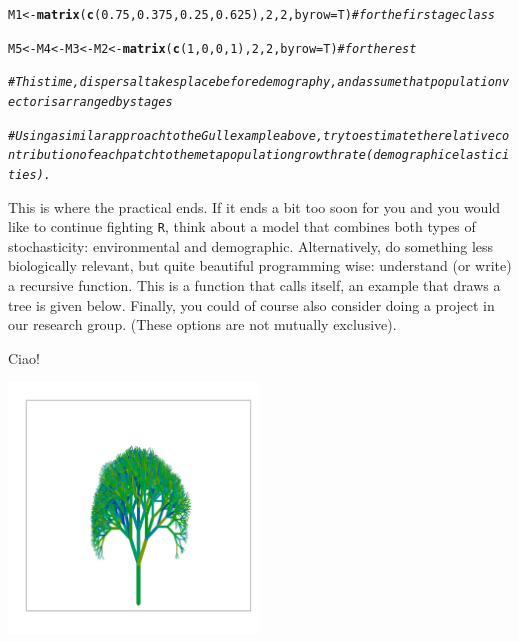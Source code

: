 \documentclass{article}\usepackage[]{graphicx}\usepackage[]{color}
\makeatletter
\newcommand{\hlnum}[1]{\textcolor[rgb]{0.686,0.059,0.569}{#1}}%
\newcommand{\hlcom}[1]{\textcolor[rgb]{0.678,0.584,0.686}{\textit{#1}}}%
\newcommand{\hlstd}[1]{\textcolor[rgb]{0.345,0.345,0.345}{#1}}%
\newcommand{\hlkwb}[1]{\textcolor[rgb]{0.69,0.353,0.396}{#1}}%
\newcommand{\hlkwc}[1]{\textcolor[rgb]{0.333,0.667,0.333}{#1}}%
\newcommand{\hlkwd}[1]{\textcolor[rgb]{0.737,0.353,0.396}{\textbf{#1}}}%
\newenvironment{kframe}{%
 \def\at@end@of@kframe{}%
 \ifinner\ifhmode%
  \def\at@end@of@kframe{\end{minipage}}%
  \begin{minipage}{\columnwidth}%
 \fi\fi%
 \def\FrameCommand##1{\hskip\@totalleftmargin \hskip-\fboxsep
 \colorbox{shadecolor}{##1}\hskip-\fboxsep
     \hskip-\linewidth \hskip-\@totalleftmargin \hskip\columnwidth}%
 \MakeFramed {\advance\hsize-\width
   \@totalleftmargin\z@ \linewidth\hsize
   \@setminipage}}%
 {\par\unskip\endMakeFramed%
 \at@end@of@kframe}
\newenvironment{knitrout}{}{} %
\makeatother
\begin{document}
\begin{knitrout}
\begin{kframe}
\begin{alltt}
\hlstd{M1}\hlkwb{<-}\hlkwd{matrix}\hlstd{(}\hlkwd{c}\hlstd{(}\hlnum{0.75}\hlstd{,}\hlnum{0.375}\hlstd{,}\hlnum{0.25}\hlstd{,}\hlnum{0.625}\hlstd{),}\hlnum{2}\hlstd{,}\hlnum{2}\hlstd{,}\hlkwc{byrow}\hlstd{=T)}  \hlcom{# for the first age class}

\hlstd{M5}\hlkwb{<-}\hlstd{M4}\hlkwb{<-}\hlstd{M3}\hlkwb{<-}\hlstd{M2}\hlkwb{<-}\hlkwd{matrix}\hlstd{(}\hlkwd{c}\hlstd{(}\hlnum{1}\hlstd{,}\hlnum{0}\hlstd{,}\hlnum{0}\hlstd{,}\hlnum{1}\hlstd{),}\hlnum{2}\hlstd{,}\hlnum{2}\hlstd{,}\hlkwc{byrow}\hlstd{=T)} \hlcom{# for the rest}


\hlcom{# This time, dispersal takes place before demography, and assume that population vector is arranged by stages}

\hlcom{# Using a similar approach to the Gull example above, try to estimate the relative contribution of each patch to the metapopulation growth rate (demographic elasticities).}
\end{alltt}
\end{kframe}
\end{knitrout}

\vspace{2ex}

This is where the practical ends. If it ends a bit too soon for you and you would like to continue fighting \texttt{R}, think about a model that combines both types of stochasticity: environmental and demographic. Alternatively, do something less biologically relevant, but quite beautiful programming wise: understand (or write) a recursive function. This is a function that calls itself, an example that draws a tree is given below. Finally, you could of course also consider doing a project in our research group. (These options are not mutually exclusive).

\begin{center}
Ciao!
\end{center}
\begin{knitrout}
\color{fgcolor}

{\centering \includegraphics[width=0.5\textwidth]{figure/rectree-1} 

}



\end{knitrout}
\end{document}
